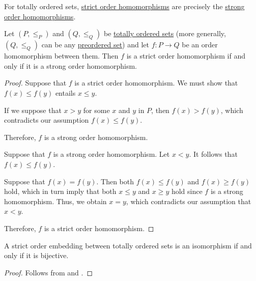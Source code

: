 \begin{proposition}\label{thm:totally_ordered_strong_homomorphism}
  For totally ordered sets, \hyperref[def:partially_ordered_set/homomorphism]{strict order homomorphisms} are precisely the \hyperref[rem:first_order_strong_homomorphism]{strong order homomorphisms}.

  Let \( (P, \leq_P) \) and \( (Q, \leq_Q) \) be \hyperref[def:totally_ordered_set]{totally ordered sets} (more generally, \( (Q, \leq_Q) \) can be any \hyperref[def:preordered_set]{preordered set}) and let \( f: P \to Q \) be an order homomorphism between them. Then \( f \) is a strict order homomorphism if and only if it is a strong order homomorphism.
\end{proposition}
\begin{proof}
  \SufficiencySubProof Suppose that \( f \) is a strict order homomorphism. We must show that \( f(x) \leq f(y) \) entails \( x \leq y \).

  If we suppose that \( x > y \) for some \( x \) and \( y \) in \( P \), then \( f(x) > f(y) \), which contradicts our assumption \( f(x) \leq f(y) \).

  Therefore, \( f \) is a strong order homomorphism.

  \NecessitySubProof Suppose that \( f \) is a strong order homomorphism. Let \( x < y \). It follows that \( f(x) \leq f(y) \).

  Suppose that \( f(x) = f(y) \). Then both \( f(x) \leq f(y) \) and \( f(x) \geq f(y) \) hold, which in turn imply that both \( x \leq y \) and \( x \geq y \) hold since \( f \) is a strong homomorphism. Thus, we obtain \( x = y \), which contradicts our assumption that \( x < y \).

  Therefore, \( f \) is a strict order homomorphism.
\end{proof}

\begin{corollary}\label{thm:totally_ordered_strict_isomorphisms}
  A strict order embedding between totally ordered sets is an isomorphism if and only if it is bijective.
\end{corollary}
\begin{proof}
  Follows from  and .
\end{proof}

